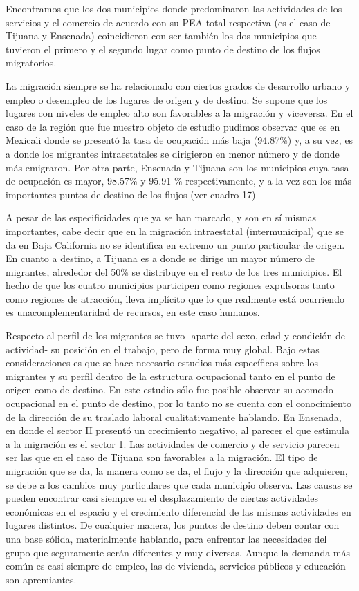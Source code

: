 \documentclass{article}
\begin{document}
Encontramos que los dos municipios donde predominaron las actividades de los servicios y el comercio de acuerdo con su PEA total respectiva (es el caso de Tijuana y Ensenada) coincidieron con ser también los dos municipios que tuvieron el primero y el segundo lugar como punto de destino de los flujos migratorios.

La migración siempre se ha relacionado con ciertos grados de desarrollo urbano y empleo o desempleo de los lugares de origen y de destino. Se supone que los lugares con niveles de empleo alto son favorables a la migración y viceversa. En el caso de la región que fue nuestro objeto de estudio pudimos observar que es en Mexicali donde se presentó la tasa de ocupación más baja (94.87\%) y, a su vez, es a donde los migrantes intraestatales se dirigieron en menor número y de donde más emigraron. Por otra parte, Ensenada y Tijuana son los municipios cuya tasa de ocupación es mayor, 98.57\% y 95.91 \% respectivamente, y a la vez son los más importantes puntos de destino de los flujos (ver cuadro 17)

A pesar de las especificidades que ya se han marcado, y son en sí mismas importantes, cabe decir que en la migración intraestatal (intermunicipal) que se da en Baja California no se identifica en extremo un punto particular de origen. En cuanto a destino, a Tijuana es a donde se dirige un mayor número de migrantes, alrededor del 50\% se distribuye en el resto de los tres municipios. El hecho de que los cuatro municipios participen como regiones expulsoras tanto como regiones de atracción, lleva implícito que lo que realmente está ocurriendo es unacomplementaridad de recursos, en este caso humanos.

Respecto al perfil de los migrantes se tuvo -aparte del sexo, edad y condición de actividad- su posición en el trabajo, pero de forma muy global. Bajo estas consideraciones es que se hace necesario estudios más específicos sobre los migrantes y su perfil dentro de la estructura ocupacional tanto en el punto de origen como de destino. En este estudio sólo fue posible observar su acomodo ocupacional en el punto de destino, por lo tanto no se cuenta con el conocimiento de la dirección de su traslado laboral cualitativamente hablando. En Ensenada, en donde el sector II presentó un crecimiento negativo, al parecer el que estimula a la migración es el sector 1. Las actividades de comercio y de servicio parecen ser las que en el caso de Tijuana son favorables a la migración. El tipo de migración que se da, la manera como se da, el flujo y la dirección que adquieren, se debe a los cambios muy particulares que cada municipio observa. Las causas se pueden encontrar casi siempre en el desplazamiento de ciertas actividades económicas en el espacio y el crecimiento diferencial de las mismas actividades en lugares distintos. De cualquier manera, los puntos de destino deben contar con una base sólida, materialmente hablando, para enfrentar las necesidades del grupo que seguramente serán diferentes y muy diversas. Aunque la demanda más común es casi siempre de empleo, las de vivienda, servicios públicos y educación son apremiantes.
\end{document}
